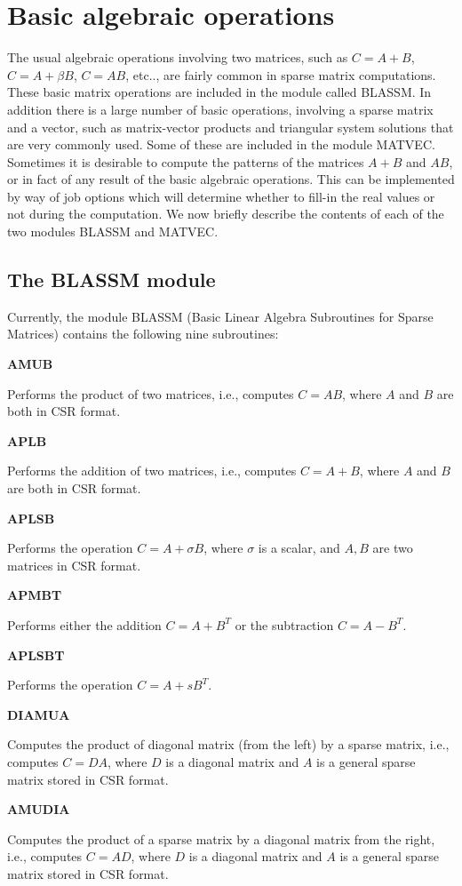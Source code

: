 \documentclass[12pt]{article}
\def\marg#1{\parbox[b]{1.3in}{\bf #1}}
\def\disp#1{\parbox[t]{4.62in}{#1} \vskip 0.2in }
\begin{document}
\section{Basic algebraic operations}
The usual algebraic operations involving two matrices,
such as $C= A+ B$, $C= A+\beta B$, $C= A B $, etc..,
are fairly common in sparse matrix computations.
These basic matrix operations
are included in the module called BLASSM.  In addition there is a
large number of basic operations, involving a sparse matrix
and a vector, such as matrix-vector products and
triangular system solutions that are very commonly used. Some of
these are included in the module MATVEC.
Sometimes it is desirable to compute the 
patterns of the matrices $A+B$ and $AB$, or in fact of any result 
of the basic algebraic  operations. This can be implemented by
way of job options which will determine whether to fill-in the real
values or not during the computation.  
We now briefly describe the contents of each of the 
two modules BLASSM and MATVEC. 

\subsection{The BLASSM module} 
Currently, the module BLASSM (Basic Linear Algebra Subroutines for
Sparse Matrices) contains the following nine subroutines:

\vskip 0.3in

\marg{ AMUB }\disp{ Performs the product of two matrices, i.e.,
computes $C = A B $, where $A$ and $B$ are both in CSR format.}

\marg{  APLB }\disp{ Performs the addition of two matrices, i.e.,
computes $C = A + B $, where $A$ and $B$ are both in CSR format.}

\marg{ APLSB }\disp{ Performs the operation $ C=A + \sigma B $, 
where $\sigma$ is a scalar, and $A, B$ are two matrices in 
CSR format. }

\marg{ APMBT }\disp{ Performs either the addition $C = A + B^T$ or the 
subtraction $C=A-B^T$.  }

\marg{ APLSBT }\disp{ Performs the operation $C = A + s B^T$. }

\marg{ DIAMUA }\disp{   Computes the product of diagonal 
matrix (from the left) by a sparse matrix, i.e.,
computes $C = D A$, where $D$ is a diagonal matrix and $A$
is a general sparse matrix stored in CSR format. }

\marg{ AMUDIA }\disp{ Computes the product of a sparse 
matrix by a diagonal matrix from the right, i.e., 
computes $C = A D $, where $D$ is a diagonal matrix and $A$
is a general sparse matrix stored in CSR format. }
\end{document}

